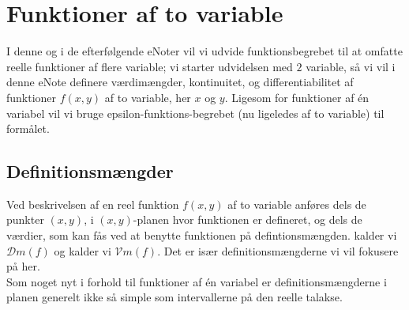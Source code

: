
\setcounter{chapter}{14} %



%
%


\chapter{Funktioner af to variable} \label{tn15}


\begin{basis}
I denne og i de efterfølgende eNoter vil vi udvide funktionsbegrebet til at omfatte reelle funktioner af flere variable;  vi starter udvidelsen med $2$ variable, så vi vil i denne eNote definere værdimængder, kontinuitet, og differentiabilitet af funktioner $f(x,y)$ af to variable, her $x$ og $y$. Ligesom for funktioner af \'{e}n variabel vil vi bruge epsilon-funktions-begrebet (nu ligeledes af to variable) til formålet.
\end{basis}





\section{Definitionsmængder} \label{secDefVal}
Ved beskrivelsen af en reel funktion $f(x,y)$ af to variable anføres dels de punkter $(x, y)$, i $(x,y)$-planen hvor funktionen er defineret, og dels de
værdier, som kan fås ved at benytte funktionen på defintionsmængden.  kalder vi $\mathcal{D}m(f)$ og  kalder vi $\mathcal{V}m(f)$. Det er især definitionsmængderne vi vil fokusere på her. \\

Som noget nyt i forhold til funktioner af \'{e}n variabel er definitionsmængderne i planen generelt ikke så simple som intervallerne på den reelle talakse.

